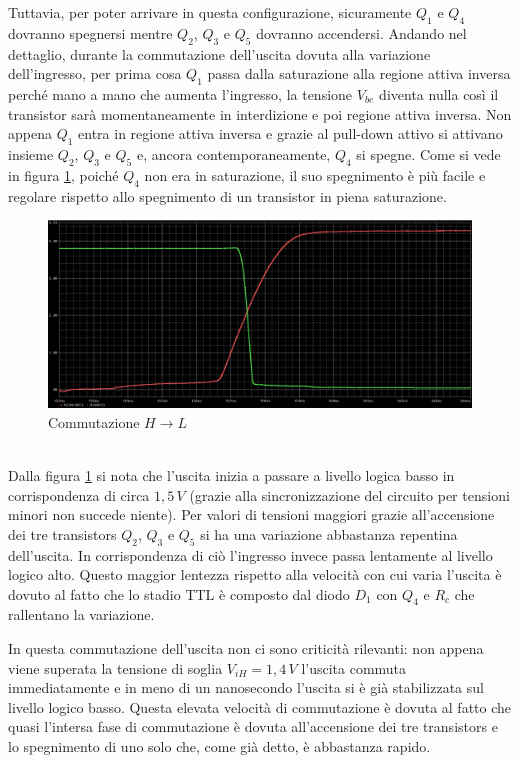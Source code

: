 \documentclass[12pt, a4paper]{report}
\begin{document}
Tuttavia, per poter arrivare in questa configurazione, sicuramente $Q_1$ e $Q_4$ dovranno spegnersi mentre $Q_2$, $Q_3$ e $Q_5$ dovranno accendersi. Andando nel dettaglio, durante la commutazione dell'uscita dovuta alla variazione dell'ingresso, per prima cosa $Q_1$ passa dalla saturazione alla regione attiva inversa perché mano a mano che aumenta l'ingresso, la tensione $V_{be}$ diventa nulla così il transistor sarà momentaneamente in interdizione e poi regione attiva inversa. Non appena $Q_1$ entra in regione attiva inversa e grazie al pull-down attivo si attivano insieme $Q_2$, $Q_3$ e $Q_5$ e, ancora contemporaneamente, $Q_4$ si spegne. Come si vede in figura \ref{h_to_l}, poiché $Q_4$ non era in saturazione, il suo spegnimento è più facile e regolare rispetto allo spegnimento di un transistor in piena saturazione.
\begin{figure}[ht]
    \centering
    \includegraphics[scale=0.35,angle=0]{ttl_h_to_l.png}
    \caption{Commutazione $H \rightarrow L$}
    \label{h_to_l}
\end{figure}
\\Dalla figura \ref{h_to_l} si nota che l'uscita inizia a passare a livello logica basso in corrispondenza di circa $1,5\,V$ (grazie alla sincronizzazione del circuito per tensioni minori non succede niente). Per valori di tensioni maggiori grazie all'accensione dei tre transistors $Q_2$, $Q_3$ e $Q_5$ si ha una variazione abbastanza repentina dell'uscita. In corrispondenza di ciò l'ingresso invece passa lentamente al livello logico alto. Questo maggior lentezza rispetto alla velocità con cui varia l'uscita è dovuto al fatto che lo stadio TTL è composto dal diodo $D_1$ con $Q_4$ e $R_c$ che rallentano la variazione.

In questa commutazione dell'uscita non ci sono criticità rilevanti: non appena viene superata la tensione di soglia $V_{iH} = 1,4\,V$ l'uscita commuta immediatamente e in meno di un nanosecondo l'uscita si è già stabilizzata sul livello logico basso. Questa elevata velocità di commutazione è dovuta al fatto che quasi l'intersa fase di commutazione è dovuta all'accensione dei tre transistors e lo spegnimento di uno solo che, come già detto, è abbastanza rapido.
\end{document}
